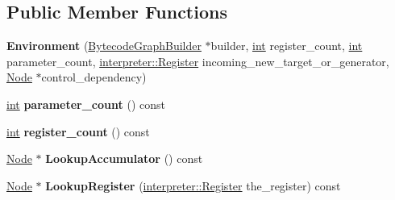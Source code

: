 \subsection*{Public Member Functions}
\begin{DoxyCompactItemize}
\item 
\mbox{\label{classv8_1_1internal_1_1compiler_1_1BytecodeGraphBuilder_1_1Environment_ab9f0f0db1784856044c93cd938712fdf}} 
{\bfseries Environment} (\mbox{\hyperlink{classv8_1_1internal_1_1compiler_1_1BytecodeGraphBuilder}{Bytecode\+Graph\+Builder}} $\ast$builder, \mbox{\hyperlink{classint}{int}} register\+\_\+count, \mbox{\hyperlink{classint}{int}} parameter\+\_\+count, \mbox{\hyperlink{classv8_1_1internal_1_1interpreter_1_1Register}{interpreter\+::\+Register}} incoming\+\_\+new\+\_\+target\+\_\+or\+\_\+generator, \mbox{\hyperlink{classv8_1_1internal_1_1compiler_1_1Node}{Node}} $\ast$control\+\_\+dependency)
\item 
\mbox{\label{classv8_1_1internal_1_1compiler_1_1BytecodeGraphBuilder_1_1Environment_a99d71f411a552b016f7b2952cbfba071}} 
\mbox{\hyperlink{classint}{int}} {\bfseries parameter\+\_\+count} () const
\item 
\mbox{\label{classv8_1_1internal_1_1compiler_1_1BytecodeGraphBuilder_1_1Environment_a54f1d0f1593db3e2d080ad3945c048f1}} 
\mbox{\hyperlink{classint}{int}} {\bfseries register\+\_\+count} () const
\item 
\mbox{\label{classv8_1_1internal_1_1compiler_1_1BytecodeGraphBuilder_1_1Environment_a102872987255756248d3d44c103ca83a}} 
\mbox{\hyperlink{classv8_1_1internal_1_1compiler_1_1Node}{Node}} $\ast$ {\bfseries Lookup\+Accumulator} () const
\item 
\mbox{\label{classv8_1_1internal_1_1compiler_1_1BytecodeGraphBuilder_1_1Environment_adfcb85ec396121bd81848900c8e4a0b7}} 
\mbox{\hyperlink{classv8_1_1internal_1_1compiler_1_1Node}{Node}} $\ast$ {\bfseries Lookup\+Register} (\mbox{\hyperlink{classv8_1_1internal_1_1interpreter_1_1Register}{interpreter\+::\+Register}} the\+\_\+register) const

\end{DoxyCompactItemize}
